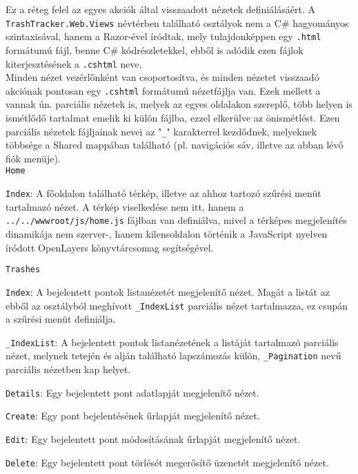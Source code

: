 Ez a réteg felel az egyes akciók által visszaadott nézetek definiálásáért. A \texttt{TrashTracker.Web.Views} névtérben található osztályok nem a C\# hagyományos szintaxisával, hanem a Razor-ével íródtak, mely tulajdonképpen egy \texttt{.html} formátumú fájl, benne C\# kódrészletekkel, ebből is adódik ezen fájlok kiterjesztésének a \texttt{.cshtml} neve.\\
Minden nézet vezérlőnként van csoportosítva, és minden nézetet visszaadó akciónak pontosan egy \texttt{.cshtml} formátumú nézetfájlja van. Ezek mellett a vannak ún. parciális nézetek is, melyek az egyes oldalakon szereplő, több helyen is ismétlődő tartalmat emelik ki külön fájlba, ezzel elkerülve az önismétlést. Ezen parciális nézetek fájljainak nevei az "\texttt{\_}" karakterrel kezdődnek, melyeknek többsége a Shared mappában található (pl. navigációs sáv, illetve az abban lévő fiók menüje).\\
\texttt{Home}
\begin{compactitem}
	\item \texttt{Index}: A főoldalon található térkép, illetve az ahhoz tartozó szűrési menüt tartalmazó nézet. A térkép viselkedése nem itt, hanem a \texttt{../../wwwroot/js/home.js} fájlban van definiálva, mivel a térképes megjelenítés dinamikája nem szerver-, hanem kilensoldalon történik a JavaScript nyelven íródott OpenLayers könyvtárcsomag segítségével.
\end{compactitem}
\texttt{Trashes}
\begin{compactitem}
	\item \texttt{Index}: A bejelentett pontok listanézetét megjelenítő nézet. Magát a listát az ebből az osztályból meghívott \texttt{\_IndexList} parciális nézet tartalmazza, ez csupán a szűrési menüt definiálja.
	\begin{compactitem}
		\item \texttt{\_IndexList}: A bejelentett pontok listanézetének a listáját tartalmazó parciális nézet, melynek tetején és alján található lapszámozás külön, \texttt{\_Pagination} nevű parciális nézetben kap helyet.
	\end{compactitem}
	\item \texttt{Details}: Egy bejelentett pont adatlapját megjelenítő nézet.
	\item \texttt{Create}: Egy pont bejelentésének űrlapját megjelenítő nézet.
	\item \texttt{Edit}: Egy bejelentett pont módosításának űrlapját megjelenítő nézet.
	\item \texttt{Delete}: Egy bejelentett pont törlését megerősítő üzenetét megjelenítő nézet.
\end{compactitem}
